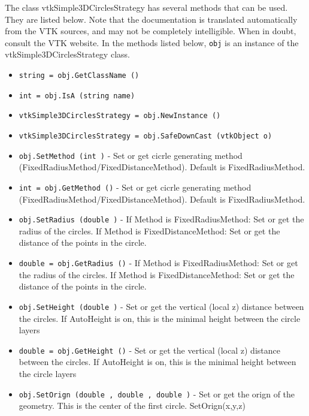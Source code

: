 The class vtkSimple3DCirclesStrategy has several methods that can be used.
  They are listed below.
Note that the documentation is translated automatically from the VTK sources,
and may not be completely intelligible.  When in doubt, consult the VTK website.
In the methods listed below, \verb|obj| is an instance of the vtkSimple3DCirclesStrategy class.
\begin{itemize}
\item  \verb|string = obj.GetClassName ()|

\item  \verb|int = obj.IsA (string name)|

\item  \verb|vtkSimple3DCirclesStrategy = obj.NewInstance ()|

\item  \verb|vtkSimple3DCirclesStrategy = obj.SafeDownCast (vtkObject o)|

\item  \verb|obj.SetMethod (int )| -  Set or get cicrle generating method (FixedRadiusMethod/FixedDistanceMethod). Default is FixedRadiusMethod.

\item  \verb|int = obj.GetMethod ()| -  Set or get cicrle generating method (FixedRadiusMethod/FixedDistanceMethod). Default is FixedRadiusMethod.

\item  \verb|obj.SetRadius (double )| -  If Method is FixedRadiusMethod: Set or get the radius of the circles.
 If Method is FixedDistanceMethod: Set or get the distance of the points in the circle.

\item  \verb|double = obj.GetRadius ()| -  If Method is FixedRadiusMethod: Set or get the radius of the circles.
 If Method is FixedDistanceMethod: Set or get the distance of the points in the circle.

\item  \verb|obj.SetHeight (double )| -  Set or get the vertical (local z) distance between the circles. If AutoHeight is on, this is the minimal height between
 the circle layers

\item  \verb|double = obj.GetHeight ()| -  Set or get the vertical (local z) distance between the circles. If AutoHeight is on, this is the minimal height between
 the circle layers

\item  \verb|obj.SetOrign (double , double , double )| -  Set or get the orign of the geometry. This is the center of the first circle. SetOrign(x,y,z)


\end{itemize}
